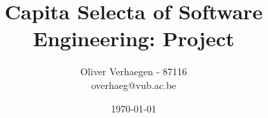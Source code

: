 \documentclass[pdftex,11pt,a4paper]{article}
\author{Oliver Verhaegen - 87116\\
overhaeg@vub.ac.be}
\title{Capita Selecta of Software Engineering: Project}
\date{\today}
\begin{document}
\maketitlepage

\tableofcontents
\clearpage

\begin{abstract}

\end{abstract}

\section{}
\end{document}
